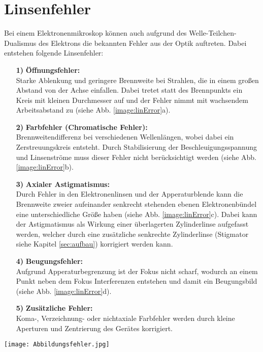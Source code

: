 \section{Linsenfehler}
\label{sec:linError}

Bei einem Elektronenmikroskop können auch aufgrund des Welle-Teilchen-Dualismus des Elektrons die bekannten Fehler aus der Optik auftreten. Dabei entstehen folgende Linsenfehler:
\begin{itemize}
    \item[\textbf{1)}]\textbf{Öffnungsfehler:}\\
    Starke Ablenkung und geringere Brennweite bei Strahlen, die in einem großen Abstand von der Achse einfallen. Dabei tretet statt des Brennpunkts ein Kreis mit kleinen Durchmesser auf und der Fehler nimmt mit wachsendem Arbeitsabstand zu (siehe Abb. \ref{image:linError}a). 
    \item[\textbf{2)}]\textbf{Farbfehler (Chromatische Fehler):}\\
    Brennweitendifferenz bei verschiedenen Wellenlängen, wobei dabei ein Zerstreuungskreis entsteht. Durch Stabilisierung der Beschleuigungsspannung und Linsenströme muss dieser Fehler nicht berücksichtigt werden (siehe Abb. \ref{image:linError}b).
    \item[\textbf{3)}]\textbf{Axialer Astigmatismus:}\\
    Durch Fehler in den Elektronenlinsen und der Apperaturblende kann die Brennweite zweier aufeinander senkrecht stehenden ebenen Elektronenbündel eine unterschiedliche Größe haben (siehe Abb. \ref{image:linError}c). Dabei kann der Astigmatismus als Wirkung einer überlagerten Zylinderlinse aufgefasst werden, welcher durch eine zusätzliche senkrechte Zylinderlinse (Stigmator siehe Kapitel \ref{sec:aufbau}) korrigiert werden kann. 
    \item[\textbf{4)}]\textbf{Beugungsfehler:}\\
    Aufgrund Apperaturbegrenzung ist der Fokus nicht scharf, wodurch an einem Punkt neben dem Fokus Interferenzen entstehen und damit ein Beugungsbild (siehe Abb. \ref{image:linError}d).
    \item[\textbf{5)}]\textbf{Zusätzliche Fehler:}\\
    Koma-, Verzeichnung- oder nichtaxiale Farbfehler werden durch kleine Aperturen und Zentrierung des Gerätes korrigiert. \citep{RasterEM}  
\end{itemize}
\newpage
\begin{center}
    \texttt{[image: Abbildungsfehler.jpg]}
    \label{image:linError}
\end{center}

